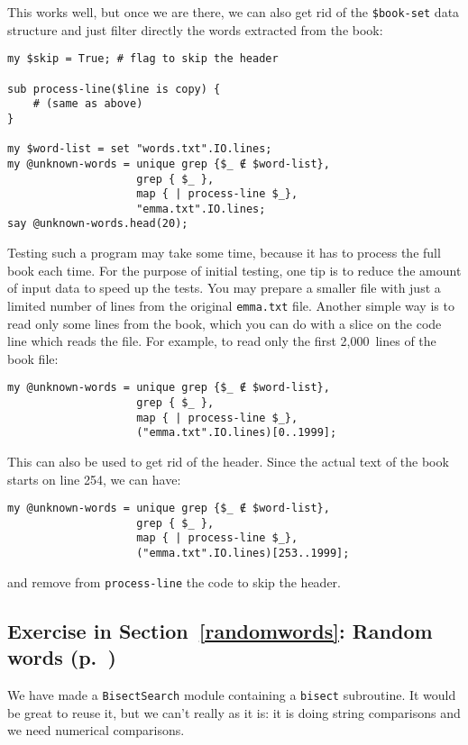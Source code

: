 This works well, but once we are there, we can also 
get rid of the \verb'$book-set' data structure and 
just filter directly the words extracted from the book:

\begin{verbatim}
my $skip = True; # flag to skip the header

sub process-line($line is copy) {
    # (same as above)
}

my $word-list = set "words.txt".IO.lines;
my @unknown-words = unique grep {$_ ∉ $word-list}, 
                    grep { $_ }, 
                    map { | process-line $_},  
                    "emma.txt".IO.lines; 
say @unknown-words.head(20);
\end{verbatim}

Testing such a program may take some time, because it has to 
process the full book each time. For the purpose of initial 
testing, one tip is to reduce the amount of input 
data to speed up the tests. You may prepare a smaller file with 
just a limited number of lines from the original {\tt emma.txt} 
file. Another simple way is to read only some lines from the 
book, which you can do with a slice on the code line which 
reads the file. For example, to read only the first 2,000~lines 
of the book file:

\begin{verbatim}
my @unknown-words = unique grep {$_ ∉ $word-list}, 
                    grep { $_ }, 
                    map { | process-line $_},  
                    ("emma.txt".IO.lines)[0..1999]; 
\end{verbatim}

This can also be used to get rid of the header. Since the 
actual text of the book starts on line 254, we can have:

\begin{verbatim}
my @unknown-words = unique grep {$_ ∉ $word-list}, 
                    grep { $_ }, 
                    map { | process-line $_},  
                    ("emma.txt".IO.lines)[253..1999]; 
\end{verbatim}
and remove from {\tt process-line} the code to skip the header.

\subsection{Exercise in Section~\ref{randomwords}: Random words (p.~\pageref{randhist})}
\label{sol_randhist}

We have made a {\tt BisectSearch} module containing a {\tt bisect} 
subroutine. It would be great to reuse it, but we can't really 
as it is: it is doing string comparisons and we need numerical  comparisons.
 
